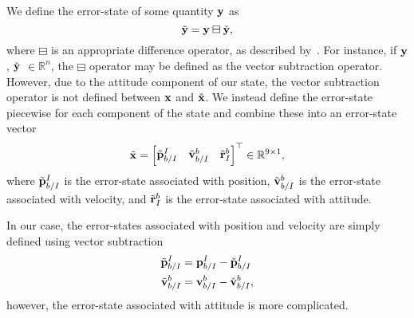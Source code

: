 We define the error-state of some quantity $\boldsymbol{\mathrm{y}}$ as
\begin{equation}
  \tilde{\boldsymbol{\mathrm{y}}}=\boldsymbol{\mathrm{y}} \boxminus \check{\boldsymbol{\mathrm{y}}},
  \label{eq:error}
\end{equation}
where $\boxminus$ is an appropriate difference operator, as described
by~\cite{hertzberg2013integrating}.  For instance, if $\boldsymbol{\mathrm{y}}$, 
$\check{\boldsymbol{\mathrm{y}}}$ $\in \mathbb{R}^{n}$, the $\boxminus$ operator may be
defined as the vector subtraction operator. However, due to the attitude component of our
state, the vector subtraction operator is not defined between $\boldsymbol{\mathrm{x}}$ and
$\check{\boldsymbol{\mathrm{x}}}$. We instead define the
error-state piecewise for
each component of the state and combine these into an error-state vector
\begin{equation}
  \tilde{\boldsymbol{\mathrm{x}}}=\begin{bmatrix}{\tilde{\boldsymbol{\mathrm{p}}}}_{b/I}^{I} &
  \tilde{\boldsymbol{\mathrm{v}}}_{b/I}^{b} &
\tilde{\boldsymbol{\mathrm{r}}}_{I}^{b}\end{bmatrix}^{\top}\in\mathbb{R}^{9\times1},
  \label{eq:error_state}
\end{equation}
where $\tilde{\boldsymbol{\mathrm{p}}}_{b/I}^{I}$ is the error-state associated with
position, $\tilde{\boldsymbol{\mathrm{v}}}_{b/I}^{b}$ is the error-state associated with
velocity, and $\tilde{\boldsymbol{\mathrm{r}}}_{I}^{b}$ is the error-state associated
with attitude.

In our case, the error-states associated with
position and velocity are simply defined using vector subtraction
\begin{align}
  \label{eq:pos_err}
  \tilde{\boldsymbol{\mathrm{p}}}_{b/I}^{I} &= \boldsymbol{\mathrm{p}}_{b/I}^{I} - \check{\boldsymbol{\mathrm{p}}}_{b/I}^{I} \\
  \tilde{\boldsymbol{\mathrm{v}}}_{b/I}^{b} &= \boldsymbol{\mathrm{v}}_{b/I}^{b} - \check{\boldsymbol{\mathrm{v}}}_{b/I}^{b},
  \label{eq:vel_err}
\end{align}
however, the error-state associated with attitude is more complicated.

